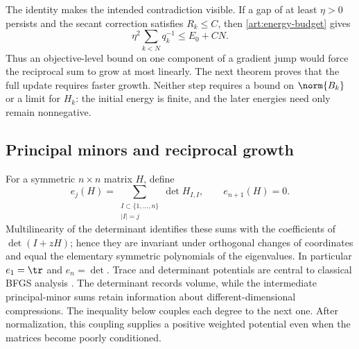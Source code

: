 The identity makes the intended contradiction visible. If a gap of at least
$\eta>0$ persists and the secant correction satisfies $R_k\le C$, then
\eqref{art:energy-budget} gives
\[
 \eta^2\sum_{k<N}q_k^{-1}\le E_0+CN.
\]
Thus an objective-level bound on one component of a gradient jump would
force the reciprocal sum to grow at most linearly. The next theorem proves
that the full update requires faster growth. Neither step requires a bound
on $\norm{B_k}$ or a limit for $H_k$: the initial energy is finite, and the
later energies need only remain nonnegative.

\subsection{Principal minors and reciprocal growth}

For a symmetric $n\times n$ matrix $H$, define
\[
 e_j(H)=\sum_{\substack{I\subset\{1,\ldots,n\}\\|I|=j}}\det H_{I,I},
 \qquad e_{n+1}(H)=0.
\]
Multilinearity of the determinant identifies these sums with the coefficients of $\det(I+zH)$; hence they are invariant
under orthogonal changes of coordinates and equal the elementary symmetric
polynomials of the eigenvalues. In particular $e_1=\tr$ and $e_n=\det$.
Trace and determinant potentials are central to classical BFGS analysis
\cite{FND_N92,FND_BN89}. The determinant records volume, while the intermediate
principal-minor sums retain information about different-dimensional
compressions. The inequality below couples each degree to the next one.
After normalization, this coupling supplies a positive weighted potential
even when the matrices become poorly conditioned.


